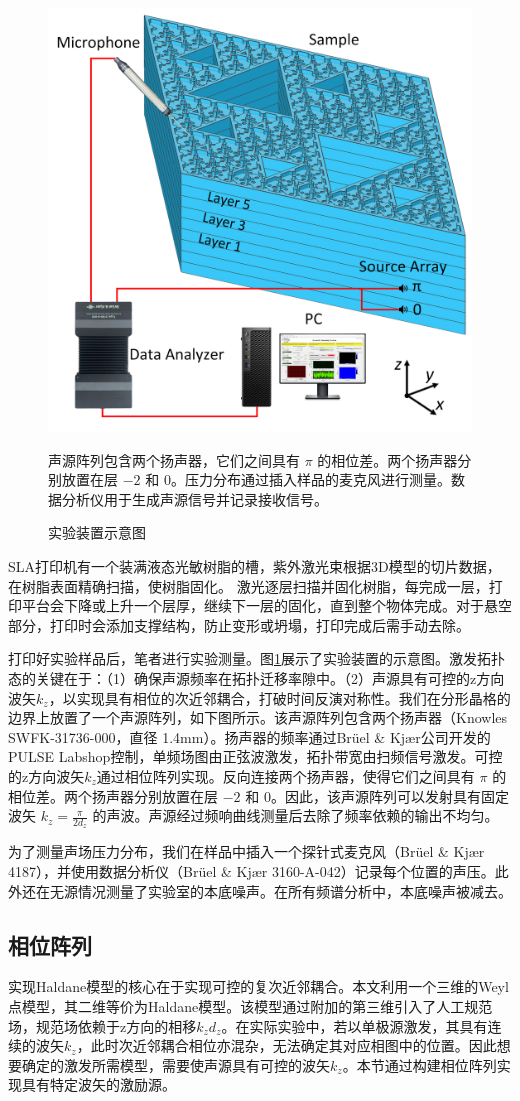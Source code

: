 \begin{figure}[htbp]
    \centering
    \includegraphics[width=0.5\linewidth]{figure/FracHaldExp/ExpSetup.png}
    \caption{实验装置示意图}声源阵列包含两个扬声器，它们之间具有 $\pi$ 的相位差。两个扬声器分别放置在层 $-2$ 和 $0$。压力分布通过插入样品的麦克风进行测量。数据分析仪用于生成声源信号并记录接收信号。
    \label{fig:ExpSetup}
\end{figure}

SLA打印机有一个装满液态光敏树脂的槽，紫外激光束根据3D模型的切片数据，在树脂表面精确扫描，使树脂固化。 激光逐层扫描并固化树脂，每完成一层，打印平台会下降或上升一个层厚，继续下一层的固化，直到整个物体完成。对于悬空部分，打印时会添加支撑结构，防止变形或坍塌，打印完成后需手动去除。

打印好实验样品后，笔者进行实验测量。图\ref{fig:ExpSetup}展示了实验装置的示意图。激发拓扑态的关键在于：（1）确保声源频率在拓扑迁移率隙中。（2）声源具有可控的z方向波矢$k_z$，以实现具有相位的次近邻耦合，打破时间反演对称性。我们在分形晶格的边界上放置了一个声源阵列，如下图所示。该声源阵列包含两个扬声器（Knowles SWFK-31736-000，直径 1.4mm）。扬声器的频率通过Brüel \& Kjær公司开发的PULSE Labshop控制，单频场图由正弦波激发，拓扑带宽由扫频信号激发。可控的z方向波矢$k_z$通过相位阵列实现。反向连接两个扬声器，使得它们之间具有 $\pi$ 的相位差。两个扬声器分别放置在层 $-2$ 和 $0$。因此，该声源阵列可以发射具有固定波矢 $k_z = \frac{\pi}{2d_z}$ 的声波。声源经过频响曲线测量后去除了频率依赖的输出不均匀。

为了测量声场压力分布，我们在样品中插入一个探针式麦克风（Brüel \& Kjær 4187），并使用数据分析仪（Brüel \& Kjær 3160-A-042）记录每个位置的声压。此外还在无源情况测量了实验室的本底噪声。在所有频谱分析中，本底噪声被减去。

\subsection{相位阵列}
实现Haldane模型的核心在于实现可控的复次近邻耦合。本文利用一个三维的Weyl点模型，其二维等价为Haldane模型。该模型通过附加的第三维引入了人工规范场，规范场依赖于z方向的相移$k_zd_z$。在实际实验中，若以单极源激发，其具有连续的波矢$k_z$，此时次近邻耦合相位亦混杂，无法确定其对应相图中的位置。因此想要确定的激发所需模型，需要使声源具有可控的波矢$k_z$。本节通过构建相位阵列实现具有特定波矢的激励源。

